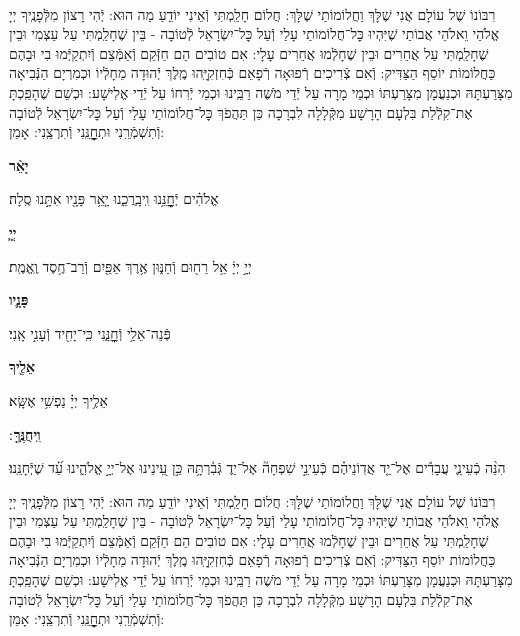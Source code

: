 \documentclass[twoside, openany, parskip=half, 11pt]{book}
\begin{document}
\begin{sometimes}
\\

 רִבּוֹנוֹ שֶׁל עוֹלָם אֲנִי שֶׁלָּךְ וַחֲלוֹמוֹתַי שֶׁלָּךְ: חֲלוֹם חָלַֽמְתִּי וְֿאֵינִי יוֹדֵֽעַ מַה הוּא: יְֿהִי רָצוֹן מִלְּֿפָנֶֽיךָ יְיָ אֱלֹהַי וֵאלֹהֵי אֲבוֹתַי שֶׁיִּהְיוּ כׇּל־חֲלוֹמוֹתַי עָלַי וְֿעַל כׇּל־יִשְׂרָאֵל לְֿטוֹבָה - בֵּין שֶׁחָלַֽמְתִּי עַל עַצְמִי וּבֵין שֶׁחָלַֽמְתִּי עַל אֲחֵרִים וּבֵין שֶׁחָלְֿמוּ אֲחֵרִים עָלָי: אִם טוֹבִים הֵם חַזְּֿקֵם וְֿאַמְּֿצֵם וְֿיִתְקַיְּֿמוּ בִי וּבָהֶם כַּחֲלוֹמוֹת יוֹסֵף הַצַּדִּיק: וְֿאִם צְֿרִיכִים רְֿפוּאָה רְֿפָאֵם כְּֿחִזְקִיָּֽהוּ מֶֽלֶךְ יְֿהוּדָה מֵחָלְֿיוֹ וּכְמִרְיָם הַנְּֿבִיאָה מִצָּרַעְתָּהּ וּכְנַעֲמָן מִצָּרַעְתּוֹ וּכְמֵי מָרָה עַל יְֿדֵי מֹשֶׁה רַבֵּֽינוּ וּכְמֵי יְֿרִחוֹ עַל יְֿדֵי אֱלִישָׁע: וּכְשֵׁם שֶׁהָפַֽכְתָּ אֶת־קִלְֿלַת בִּלְעָם הָרָשָׁע מִקְּֿלָלָה לִבְרָכָה כֵּן תַּהֲפֹךְ כׇּל־חֲלוֹמוֹתַי עָלַי וְֿעַל כׇּל־יִשְׂרָאֵל לְֿטוֹבָה וְֿתִשְׁמְֿרֵֽנִי וּתְחׇׇׇׇׇׇׇׇׇׇָנֵּֽנִי וְֿתִרְצֵֽנִי: אָמֵן:



\textbf{יָאֵ֨ר}
 \hfill \begin{footnotesize}
 אֱלֹהִ֗ים יְֿחׇׇׇׇׇׇׇׇָנֵּ֥נוּ וִֽיבָֽרֲכֵ֑נוּ יָ֤אֵ֥ר פָּנָ֖יו אִתָּ֣נוּ סֶֽלָה׃\\
 \end{footnotesize}
\textbf{יְיָ֧}
 \hfill \begin{footnotesize}
 יְיָ֣ יְיָ֔ אֵ֥ל רַח֖וּם וְֿחַנּ֑וּן אֶ֥רֶךְ אַפַּ֖יִם וְֿרַב־חֶ֥סֶד וֶֽאֱמֶֽת׃\\
 \end{footnotesize}
\textbf{פָּנָ֛יו}
 \hfill \begin{footnotesize}
 פְּֿנֵה־אֵלַ֥י וְֿחׇׇׇׇׇׇׇׇׇׇָנֵּ֑נִי כִּֽי־יָחִ֖יד וְֿעָנִ֣י אָֽנִי׃\\
 \end{footnotesize}
\textbf{אֵלֶ֖יךָ}
 \hfill \begin{footnotesize}
 אֵלֶ֥יךָ יְיָ֗ נַפְשִׁ֥י אֶשָּֽׂא׃\\
 \end{footnotesize}
\textbf{וִֽיחֻנֶּֽךָּ}
׃ \hfill \begin{footnotesize}
הִנֵּ֨ה כְֿעֵינֵ֢י עֲבָדִ֡ים אֶל־יַ֤ד אֲדֽוֹנֵיהֶ֗ם כְּֿעֵינֵ֣י שִׁפְחָה֘ אֶל־יַד֢ גְּֿבִ֫רְתָּ֥הּ כֵּ֣ן עֵ֭ינֵינוּ אֶל־יְיָ֣ אֱלֹהֵ֑ינוּ עַ֝֗ד שֶׁיְּֿחָנֵּֽנוּ׃
\end{footnotesize}


 רִבּוֹנוֹ שֶׁל עוֹלָם אֲנִי שֶׁלָּךְ וַחֲלוֹמוֹתַי שֶׁלָּךְ: חֲלוֹם חָלַֽמְתִּי וְֿאֵינִי יוֹדֵֽעַ מַה הוּא: יְֿהִי רָצוֹן מִלְּֿפָנֶֽיךָ יְיָ אֱלֹהַי וֵאלֹהֵי אֲבוֹתַי שֶׁיִּהְיוּ כׇּל־חֲלוֹמוֹתַי עָלַי וְֿעַל כׇּל־יִשְׂרָאֵל לְֿטוֹבָה - בֵּין שֶׁחָלַֽמְתִּי עַל עַצְמִי וּבֵין שֶׁחָלַֽמְתִּי עַל אֲחֵרִים וּבֵין שֶׁחָלְֿמוּ אֲחֵרִים עָלָי: אִם טוֹבִים הֵם חַזְּֿקֵם וְֿאַמְּֿצֵם וְֿיִתְקַיְּֿמוּ בִי וּבָהֶם כַּחֲלוֹמוֹת יוֹסֵף הַצַּדִּיק: וְֿאִם צְֿרִיכִים רְֿפוּאָה רְֿפָאֵם כְּֿחִזְקִיָּֽהוּ מֶֽלֶךְ יְֿהוּדָה מֵחָלְֿיוֹ וּכְמִרְיָם הַנְּֿבִיאָה מִצָּרַעְתָּהּ וּכְנַעֲמָן מִצָּרַעְתּוֹ וּכְמֵי מָרָה עַל יְֿדֵי מֹשֶׁה רַבֵּֽינוּ וּכְמֵי יְֿרִחוֹ עַל יְֿדֵי אֱלִישָׁע: וּכְשֵׁם שֶׁהָפַֽכְתָּ אֶת־קִלְֿלַת בִּלְעָם הָרָשָׁע מִקְּֿלָלָה לִבְרָכָה כֵּן תַּהֲפֹךְ כׇּל־חֲלוֹמוֹתַי עָלַי וְֿעַל כׇּל־יִשְׂרָאֵל לְֿטוֹבָה וְֿתִשְׁמְֿרֵֽנִי וּתְחׇׇׇׇׇׇׇׇׇׇָנֵּֽנִי וְֿתִרְצֵֽנִי: אָמֵן:




\end{sometimes}
\end{document}
